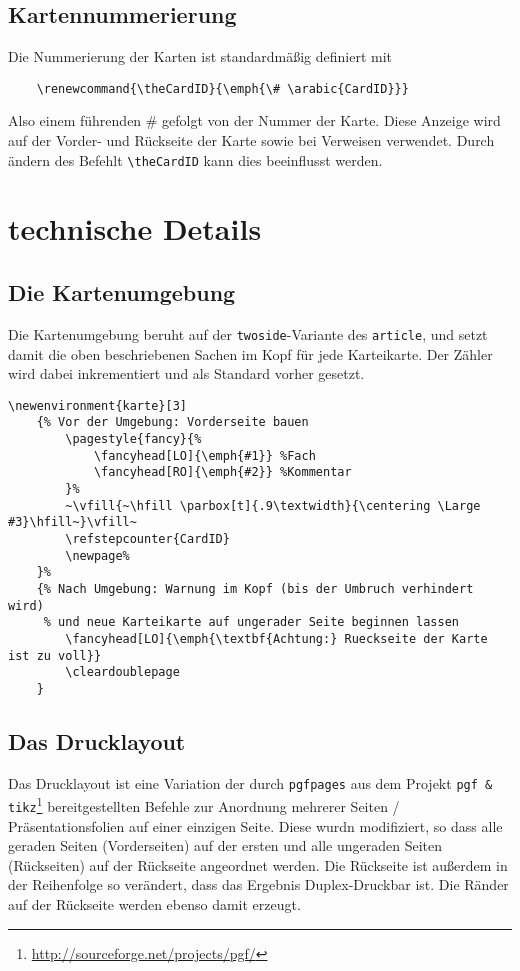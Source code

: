 \documentclass[a4paper]{article}
\begin{document}
\subsection{Kartennummerierung}
Die Nummerierung der Karten ist standardmäßig definiert mit
\begin{lstlisting}
	\renewcommand{\theCardID}{\emph{\# \arabic{CardID}}}
\end{lstlisting}
Also einem führenden \# gefolgt von der Nummer der Karte. Diese Anzeige wird auf der Vorder- und Rückseite der Karte sowie bei Verweisen verwendet. Durch ändern des Befehlt \lstinline!\theCardID! kann dies beeinflusst werden.
%
%
%
\section{technische Details}
\subsection{Die Kartenumgebung}
Die Kartenumgebung beruht auf der \lstinline!twoside!-Variante des \lstinline!article!, und setzt damit die oben beschriebenen Sachen im Kopf für jede Karteikarte. Der Zähler wird dabei inkrementiert und als Standard vorher gesetzt.
\begin{lstlisting}[title=Die Kartenumgebung]
\newenvironment{karte}[3]
	{% Vor der Umgebung: Vorderseite bauen
		\pagestyle{fancy}{% 
			\fancyhead[LO]{\emph{#1}} %Fach
			\fancyhead[RO]{\emph{#2}} %Kommentar
		}%
		~\vfill{~\hfill \parbox[t]{.9\textwidth}{\centering \Large #3}\hfill~}\vfill~
		\refstepcounter{CardID}
		\newpage%
	}%
	{% Nach Umgebung: Warnung im Kopf (bis der Umbruch verhindert wird) 
	 % und neue Karteikarte auf ungerader Seite beginnen lassen
		\fancyhead[LO]{\emph{\textbf{Achtung:} Rueckseite der Karte ist zu voll}}
		\cleardoublepage
	}
\end{lstlisting}
\subsection{Das Drucklayout}
Das Drucklayout ist eine Variation der durch \lstinline!pgfpages! aus dem Projekt \lstinline!pgf & tikz!\footnote{\url{http://sourceforge.net/projects/pgf/}} bereitgestellten Befehle zur Anordnung mehrerer Seiten / Präsentationsfolien auf einer einzigen Seite. Diese wurdn modifiziert, so dass alle geraden Seiten (Vorderseiten) auf der ersten und alle ungeraden Seiten (Rückseiten) auf der Rückseite angeordnet werden. Die Rückseite ist außerdem in der Reihenfolge so verändert, dass das Ergebnis Duplex-Druckbar ist. Die Ränder auf der Rückseite werden ebenso damit erzeugt. 
%
%
%
\end{document}
